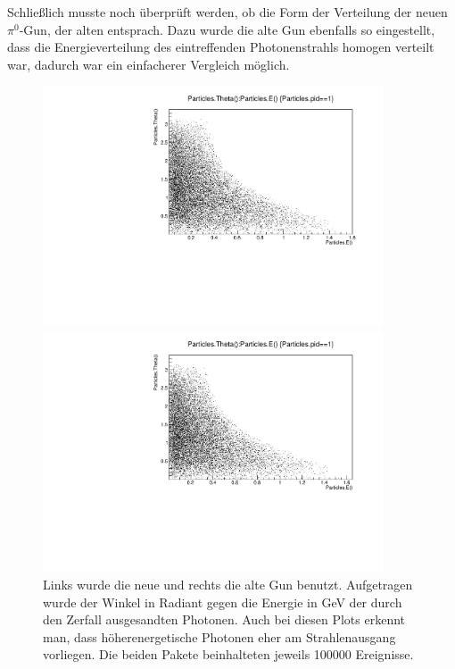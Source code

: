 \documentclass[a4paper,11pt,oneside,final,german,openbib,pdftex]{scrbook}
\begin{document}
{Schlie{\ss}lich musste noch überprüft werden, ob die Form der Verteilung der neuen $\pi^0$-Gun, der alten entsprach. Dazu wurde die alte Gun ebenfalls so eingestellt, dass die Energieverteilung des eintreffenden Photonenstrahls homogen verteilt war, dadurch war ein einfacherer Vergleich möglich. 

\begin{figure}[h!]
	\centering
	\begin{minipage}{0.45\textwidth}
		\centering
		\includegraphics[width=0.9\textwidth]{20170704Pi0_Gun_New}
	\end{minipage}
	\hfill
	\begin{minipage}{0.45\textwidth}
		\centering
		\includegraphics[width=0.9\textwidth]{20170704Pi0_Gun_Old}
	\end{minipage}
	
	\caption{Links wurde die neue und rechts die alte Gun benutzt. Aufgetragen wurde der Winkel in Radiant gegen die Energie in GeV der durch den Zerfall ausgesandten Photonen. Auch bei diesen Plots erkennt man, dass höherenergetische Photonen eher am Strahlenausgang vorliegen. Die beiden Pakete beinhalteten jeweils 100000 Ereignisse.}
	\label{fig:Vergleich-der-beiden-Guns}
\end{figure}

}
\end{document}

